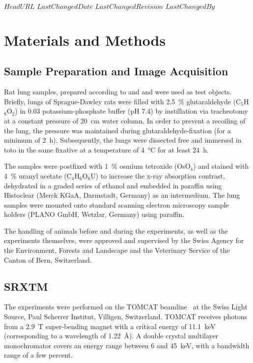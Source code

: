 \svnidlong
{$HeadURL$}
{$LastChangedDate$}
{$LastChangedRevision$}
{$LastChangedBy$}
%
\section{Materials and Methods}
\label{sec:materials and methods}
\subsection{Sample Preparation and Image Acquisition}
Rat lung samples, prepared according to %
\ifhtml
	\citet{Tschanz2002} and \citet{Luyet2002}
\else
	 and 
\fi%
were used as test objects. Briefly, lungs of Sprague-Dawley rats were filled with \SI{2.5}{\percent} glutaraldehyde (C$_5$H$_8$O$_2$) in \SI{0.03}{\Molar} potassium-phosphate buffer (pH 7.4) by instillation via tracheotomy at a constant pressure of \SI{20}{\centi\meter} water column. In order to prevent a recoiling of the lung, the pressure was maintained during glutaraldehyde-fixation (for a minimum of \SI{2}{\hour}). Subsequently, the lungs were dissected free and immersed in toto in the same fixative at a temperature of \SI{4}{\celsius} for at least \SI{24}{\hour}.

The samples were postfixed with \SI{1}{\percent} osmium tetroxide (OsO$_4$) and stained with \SI{4}{\percent} uranyl acetate (C$_4$H$_6$O$_6$U) to increase the x-ray absorption contrast, dehydrated in a graded series of ethanol and embedded in paraffin using Histoclear (Merck KGaA, Darmstadt, Germany) as an intermedium. The lung samples were mounted onto standard scanning electron microscopy sample holders (PLANO GmbH, Wetzlar, Germany) using paraffin.

The handling of animals before and during the experiments, as well as the experiments themselves, were approved and supervised by the Swiss Agency for the Environment, Forests and Landscape and the Veterinary Service of the Canton of Bern, Switzerland.

\subsection{SRXTM}
The experiments were performed on the TOMCAT beamline~\cite{Stampanoni2006a} at the Swiss Light Source, Paul Scherrer Institut, Villigen, Switzerland. TOMCAT receives photons from a \SI{2.9}{\tesla} super-bending magnet with a critical energy of \SI{11.1}{\kilo\electronvolt} (corresponding to a wavelength of \SI{1.22}{\angstrom}). A double crystal multilayer monochromator covers an energy range between 6 and \SI{45}{\kilo\electronvolt}, with a bandwidth range of a few percent.

